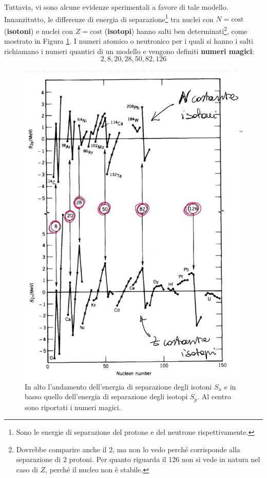 \newline
Tuttavia, vi sono alcune evidenze sperimentali a favore di tale modello. Innanzitutto, le differenze di energia di separazione\footnote{Sono le energie di separazione del protone e del neutrone rispettivamente.} tra nuclei con $N=\mbox{cost}$ (\textbf{isotoni}) e nuclei con $Z=\mbox{cost}$ (\textbf{isotopi}) hanno salti ben determinati\footnote{Dovrebbe comparire anche il 2, ma non lo vedo perché corrisponde alla separazione di 2 protoni. Per quanto riguarda il 126 non si vede in natura nel caso di $Z$, perché il nucleo non è stabile.}, come mostrato in Figura \ref{diffeng}. I numeri atomico o neutronico per i quali si hanno i salti richiamano i numeri quantici di un modello  e vengono definiti \textbf{numeri magici}:
$$2,8,20,28,50,82,126$$
\begin{figure}[!h]
    \centering
    \includegraphics[scale=0.2]{Immagini/mag-num.png}
    \caption{In alto l'andamento dell'energia di separazione degli isotoni $S_n$ e in basso quello dell'energia di separazione degli isotopi $S_p$. Al centro sono riportati i numeri magici.}
    \label{diffeng}
\end{figure}

